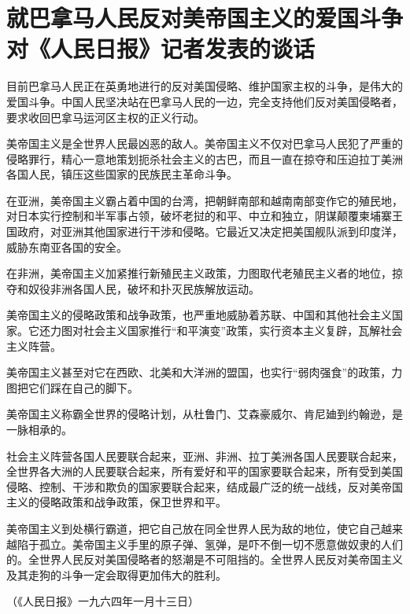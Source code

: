 \section[就巴拿马人民反对美帝国主义的爱国斗争对《人民日报》记者发表的谈话（一九六四年一月十二日）]{就巴拿马人民反对美帝国主义的爱国斗争对《人民日报》记者发表的谈话}


目前巴拿马人民正在英勇地进行的反对美国侵略、维护国家主权的斗争，是伟大的爱国斗争。中国人民坚决站在巴拿马人民的一边，完全支持他们反对美国侵略者，要求收回巴拿马运河区主权的正义行动。

美帝国主义是全世界人民最凶恶的敌人。美帝国主义不仅对巴拿马人民犯了严重的侵略罪行，精心一意地策划扼杀社会主义的古巴，而且一直在掠夺和压迫拉丁美洲各国人民，镇压这些国家的民族民主革命斗争。

在亚洲，美帝国主义霸占着中国的台湾，把朝鲜南部和越南南部变作它的殖民地，对日本实行控制和半军事占领，破坏老挝的和平、中立和独立，阴谋颠覆柬埔寨王国政府，对亚洲其他国家进行干涉和侵略。它最近又决定把美国舰队派到印度洋，威胁东南亚各国的安全。

在非洲，美帝国主义加紧推行新殖民主义政策，力图取代老殖民主义者的地位，掠夺和奴役非洲各国人民，破坏和扑灭民族解放运动。

美帝国主义的侵略政策和战争政策，也严重地威胁着苏联、中国和其他社会主义国家。它还力图对社会主义国家推行“和平演变”政策，实行资本主义复辟，瓦解社会主义阵营。

美帝国主义甚至对它在西欧、北美和大洋洲的盟国，也实行“弱肉强食”的政策，力图把它们踩在自己的脚下。

美帝国主义称霸全世界的侵略计划，从杜鲁门、艾森豪威尔、肯尼廸到约翰逊，是一脉相承的。

社会主义阵营各国人民要联合起来，亚洲、非洲、拉丁美洲各国人民要联合起来，全世界各大洲的人民要联合起来，所有爱好和平的国家要联合起来，所有受到美国侵略、控制、干涉和欺负的国家要联合起来，结成最广泛的统一战线，反对美帝国主义的侵略政策和战争政策，保卫世界和平。

美帝国主义到处横行霸道，把它自己放在同全世界人民为敌的地位，使它自己越来越陷于孤立。美帝国主义手里的原子弹、氢弹，是吓不倒一切不愿意做奴隶的人们的。全世界人民反对美国侵略者的怒潮是不可阻挡的。全世界人民反对美帝国主义及其走狗的斗争一定会取得更加伟大的胜利。

{\raggedleft （《人民日报》一九六四年一月十三日）\par}


